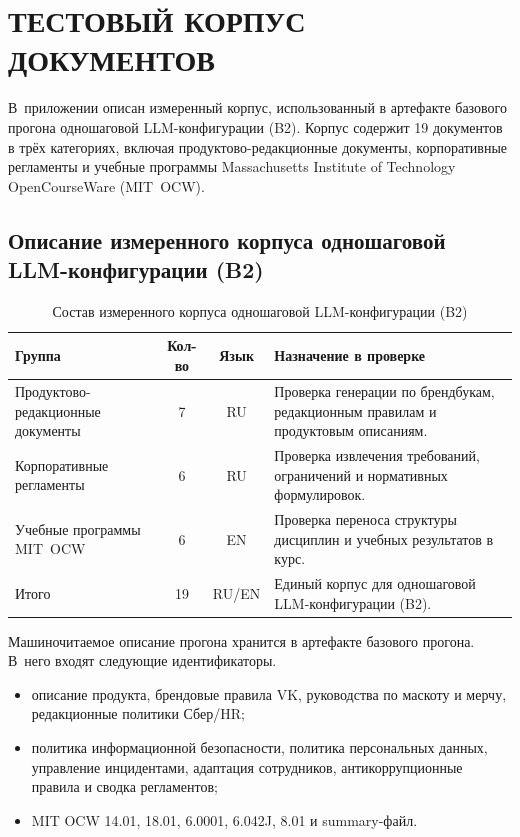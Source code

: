 \chapter{ТЕСТОВЫЙ КОРПУС ДОКУМЕНТОВ}

В~приложении описан измеренный корпус, использованный в артефакте
базового прогона одношаговой LLM-конфигурации (B2). Корпус
содержит 19 документов в трёх категориях, включая продуктово-редакционные
документы, корпоративные регламенты и учебные программы
Massachusetts Institute of Technology OpenCourseWare (MIT~OCW).

\section*{Описание измеренного корпуса одношаговой LLM-конфигурации (B2)}

\begin{table}[H]
  \centering
  \small
  \caption{Состав измеренного корпуса одношаговой LLM-конфигурации (B2)}
  \label{tab:dataset}
  \setlength{\tabcolsep}{3pt}
  \renewcommand{\arraystretch}{1.12}
  \begin{tabular}{|P{4.0cm}|c|c|P{5.4cm}|}
    \hline
    \textbf{Группа} & \textbf{Кол-во} & \textbf{Язык} & \textbf{Назначение в проверке} \\
    \hline
    Продуктово-редакционные документы & 7 & RU &
    Проверка генерации по брендбукам, редакционным правилам и продуктовым описаниям. \\
    \hline
    Корпоративные регламенты & 6 & RU &
    Проверка извлечения требований, ограничений и нормативных формулировок. \\
    \hline
    Учебные программы MIT~OCW & 6 & EN &
    Проверка переноса структуры дисциплин и учебных результатов в курс. \\
    \hline
    Итого & 19 & RU/EN &
    Единый корпус для одношаговой LLM-конфигурации (B2). \\
    \hline
  \end{tabular}
\end{table}

Машиночитаемое описание прогона хранится в артефакте базового прогона.
В~него входят следующие идентификаторы.
\begin{itemize}
  \item описание продукта, брендовые правила VK, руководства по маскоту и мерчу,
  редакционные политики Сбер/HR;
  \item политика информационной безопасности, политика персональных данных,
  управление инцидентами, адаптация сотрудников, антикоррупционные правила
  и сводка регламентов;
  \item MIT OCW 14.01, 18.01, 6.0001, 6.042J, 8.01 и summary-файл.
\end{itemize}


